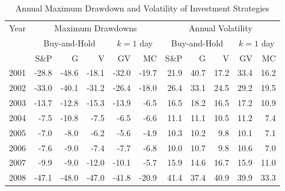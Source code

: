 \documentclass{article}
\begin{document}
\newpage
\begin{table}[!ht]
    \centering
    \caption{Annual Maximum Drawdown and Volatility of Investment Strategies}
    \medskip
    \begin{tabular}{l || rrr || rr || rrr || rr }
    \hline
\multirow{3}{*}{Year} & \multicolumn{5}{c||}{Maximum Drawdowns}& \multicolumn{5}{c}{Annual Volatility}     \\\cline{2-11}
 & \multicolumn{3}{c||}{Buy-and-Hold}   
& \multicolumn{2}{c||}{$k=1$  day} &   \multicolumn{3}{c||}{Buy-and-Hold}   & \multicolumn{2}{c}{$k=1$  day}   \\  \cline{2-11}
  & S\&P & G & V   & GV & MC & S\&P & G & V  & GV &  MC \\ \hline
        2001 & -28.8 & \cellcolor{red!25}-48.6 & \cellcolor{green!25}-18.1 & \cellcolor{red!25}-32.0 & -19.7 & 21.9 & \cellcolor{red!25}40.7 & \cellcolor{green!25}17.2 & \cellcolor{red!25}33.4 & 16.2 \\ 
        2002 & -33.0 & \cellcolor{red!25}-40.1 & \cellcolor{green!25}-31.2 & \cellcolor{red!25}-26.4 & -18.0 & 26.4 & \cellcolor{red!25}33.1 & \cellcolor{green!25}24.5 & \cellcolor{red!25}29.2 & 19.5 \\ 
        2003 & -13.7 & \cellcolor{green!25}-12.8 & \cellcolor{red!25}-15.3 & \cellcolor{red!25}-13.9 & -6.5 & \cellcolor{green!25}16.5 & \cellcolor{red!25}18.2 & \cellcolor{green!25}16.5 & \cellcolor{red!25}17.2 & 10.9 \\ 
        2004 & \cellcolor{green!25}-7.5 & \cellcolor{red!25}-10.8 & \cellcolor{green!25}-7.5 & -6.5 & \cellcolor{red!25}-6.6 & \cellcolor{red!25}11.1 & \cellcolor{red!25}11.1 & \cellcolor{green!25}10.5 & \cellcolor{red!25}11.2 & 7.4 \\ 
        2005 & -7.0 & \cellcolor{red!25}-8.0 & \cellcolor{green!25}-6.2 & \cellcolor{red!25}-5.6 & -4.9 & \cellcolor{red!25}10.3 & 10.2 & \cellcolor{green!25}9.8 & \cellcolor{red!25}10.1 & 7.1 \\ 
        2006 & -7.6 & \cellcolor{red!25}-9.0 & \cellcolor{green!25}-7.4 & \cellcolor{red!25}-7.7 & -6.8 & 10.0 & \cellcolor{red!25}10.7 & \cellcolor{green!25}9.8 & \cellcolor{red!25}10.6 & 7.0 \\ 
        2007 & -9.9 & \cellcolor{green!25}-9.0 & \cellcolor{red!25}-12.0 & \cellcolor{red!25}-10.1 & -5.7 & 15.9 & \cellcolor{green!25}14.6 & \cellcolor{red!25}16.7 & \cellcolor{red!25}15.9 & 11.0 \\ 
        2008 & -47.1 & \cellcolor{red!25}-48.0 & \cellcolor{green!25}-47.0 & \cellcolor{red!25}-41.8 & -20.9 & \cellcolor{red!25}41.4 & \cellcolor{green!25}37.4 & 40.9 & \cellcolor{red!25}39.9 & 33.3 \\ 

\end{tabular}
\end{table}
\end{document}
